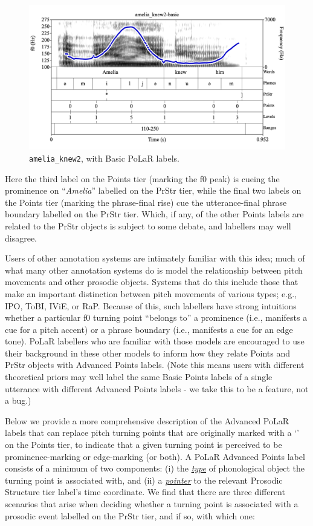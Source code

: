 \documentclass[11pt, twoside]{memoir}
\def\textlabel#1{{\relsize{-.5}\fontspec[Mapping=tex-text]{Roboto Mono}{#1}}}
\def\langtext#1{\textit{#1}}
\begin{document}
\begin{figure}[H]
\centering
%
\includegraphics[width=.875\linewidth]{Points-amelia_knew2.png}
%
\caption{\texttt{amelia\_knew2}, with Basic PoLaR labels.%
\label{fig:amelia_knew2 in Adv}%
}
\end{figure}

Here the third label on the Points tier (marking the f0 peak) is cueing the prominence on “\langtext{Amelia}” labelled on the PrStr tier, while the final two labels on the Points tier (marking the phrase-final rise) cue the utterance-final phrase boundary labelled on the PrStr tier. Which, if any, of the other Points labels are related to the PrStr objects is subject to some debate, and labellers may well disagree.

Users of other annotation systems are intimately familiar with this idea; much of what many other annotation systems do is model the relationship between pitch movements and other prosodic objects. Systems that do this include those that make an important distinction between pitch movements of various types; e.g., IPO, ToBI, IViE, or RaP. Because of this, such labellers have strong intuitions whether a particular f0 turning point “belongs to” a prominence (i.e., manifests a cue for a pitch accent) or a phrase boundary (i.e., manifests a cue for an edge tone). PoLaR labellers who are familiar with those models are encouraged to use their background in these other models to inform how they relate Points and PrStr objects with Advanced Points labels. (Note this means users with different theoretical priors may well label the same Basic Points labels of a single utterance with different Advanced Points labels - we take this to be a feature, not a bug.)

Below we provide a more comprehensive description of the Advanced PoLaR labels that can replace pitch turning points that are originally marked with a ‘\textlabel{0}’ on the Points tier, to indicate that a given turning point is perceived to be prominence-marking or edge-marking (or both). A PoLaR Advanced Points label consists of a minimum of two components: (i) the \textit{\uline{type}} of phonological object the turning point is associated with, and (ii) a \textit{\uline{pointer}} to the relevant Prosodic Structure tier label’s time coordinate. We find that there are three different scenarios that arise when deciding whether a turning point is associated with a prosodic event labelled on the PrStr tier, and if so, with which one:
\end{document}
